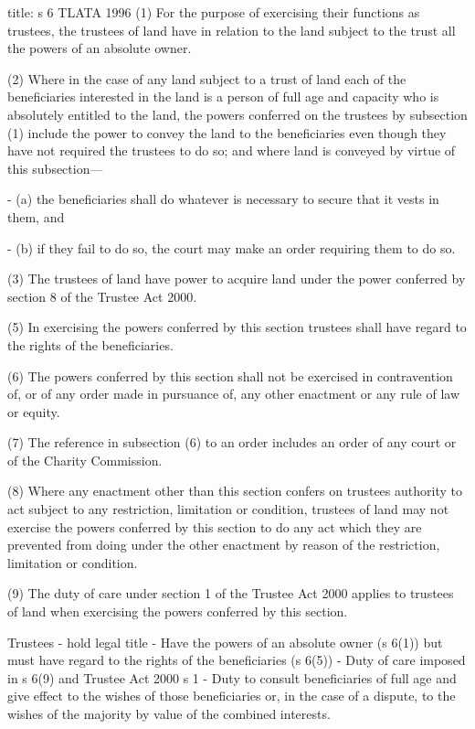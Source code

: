\documentclass[
]{article}
\newenvironment{Shaded}{}{}
\newcommand{\NormalTok}[1]{#1}
\begin{document}
\begin{Shaded}
\begin{Highlighting}[]
\NormalTok{title: s 6 TLATA 1996}
\NormalTok{(1) For the purpose of exercising their functions as trustees, the trustees of land have in relation to the land subject to the trust all the powers of an absolute owner.}

\NormalTok{(2) Where in the case of any land subject to a trust of land each of the beneficiaries interested in the land is a person of full age and capacity who is absolutely entitled to the land, the powers conferred on the trustees by subsection (1) include the power to convey the land to the beneficiaries even though they have not required the trustees to do so; and where land is conveyed by virtue of this subsection—}

\NormalTok{{-} (a) the beneficiaries shall do whatever is necessary to secure that it vests in them, and}

\NormalTok{{-} (b) if they fail to do so, the court may make an order requiring them to do so.}

\NormalTok{(3) The trustees of land have power to acquire land under the power conferred by section 8 of the Trustee Act 2000.}

\NormalTok{(5) In exercising the powers conferred by this section trustees shall have regard to the rights of the beneficiaries.}

\NormalTok{(6) The powers conferred by this section shall not be exercised in contravention of, or of any order made in pursuance of, any other enactment or any rule of law or equity.}

\NormalTok{(7) The reference in subsection (6) to an order includes an order of any court or of the Charity Commission.}

\NormalTok{(8) Where any enactment other than this section confers on trustees authority to act subject to any restriction, limitation or condition, trustees of land may not exercise the powers conferred by this section to do any act which they are prevented from doing under the other enactment by reason of the restriction, limitation or condition.}

\NormalTok{(9) The duty of care under section 1 of the Trustee Act 2000 applies to trustees of land when exercising the powers conferred by this section.}
\end{Highlighting}
\end{Shaded}

\begin{Shaded}
\begin{Highlighting}[]
\NormalTok{Trustees {-} hold legal title}
\NormalTok{{-} Have the powers of an absolute owner (s 6(1)) but must have regard to the rights of the beneficiaries (s 6(5))}
\NormalTok{{-} Duty of care imposed in s 6(9) and Trustee Act 2000 s 1}
\NormalTok{{-} Duty to consult beneficiaries of full age and give effect to the wishes of those beneficiaries or, in the case of a dispute, to the wishes of the majority by value of the combined interests.}
\end{Highlighting}
\end{Shaded}
\end{document}
